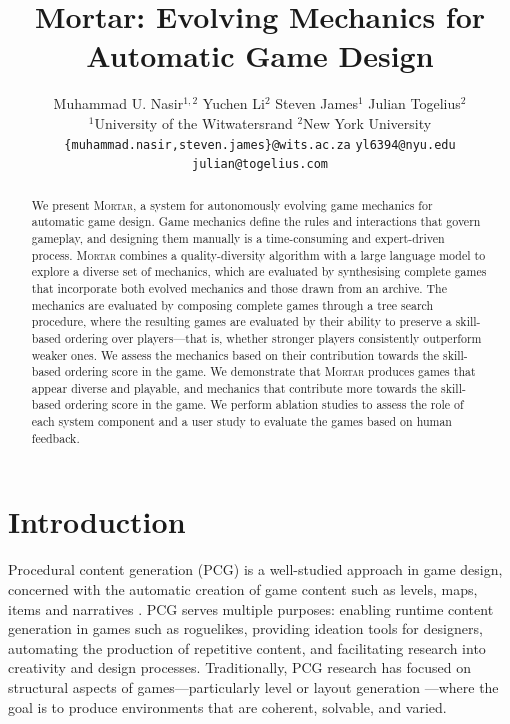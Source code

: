 \documentclass{article} %
\title{Mortar: Evolving Mechanics for \\ Automatic Game Design}
\author{   Muhammad U. Nasir$^{1,2}$ \quad Yuchen Li$^2$ \quad Steven James$^1$ \quad Julian Togelius$^2$\\
$^1$University of the Witwatersrand \quad $^2$New York University\\
\texttt{\{muhammad.nasir,steven.james\}@wits.ac.za} \quad 
\texttt{yl6394@nyu.edu} \\
\texttt{julian@togelius.com}
}
\newcommand{\name}{\textsc{Mortar}}
\begin{document}
\maketitle

\begin{abstract}
We present \name{}, a system for autonomously evolving game mechanics for automatic game design. Game mechanics define the rules and interactions that govern gameplay, and designing them manually is a time-consuming and expert-driven process. \name{} combines a quality-diversity algorithm with a large language model to explore a diverse set of mechanics, which are evaluated by synthesising complete games that incorporate both evolved mechanics and those drawn from an archive.
The mechanics are evaluated by composing complete games through a tree search procedure, where the resulting games are evaluated by their ability to preserve a skill-based ordering over players---that is, whether stronger players consistently outperform weaker ones. We assess the mechanics based on their contribution towards the skill-based ordering score in the game. We demonstrate that \name{} produces games that appear diverse and playable, and mechanics that contribute more towards the skill-based ordering score in the game. We perform ablation studies to assess the role of each system component and a user study to evaluate the games based on human feedback.
\end{abstract}




\section{Introduction}


Procedural content generation (PCG) is a well-studied approach in game design, concerned with the automatic creation of game content such as levels, maps, items and narratives \citep{shaker2016procedural,liu2021deep}.
PCG serves multiple purposes: enabling runtime content generation in games such as roguelikes, providing ideation tools for designers, automating the production of repetitive content, and facilitating research into creativity and design processes.
Traditionally, PCG research has focused on structural aspects of games---particularly level or layout generation \citep{risi2020increasing}---where the goal is to produce environments that are coherent, solvable, and varied. 
\end{document}

